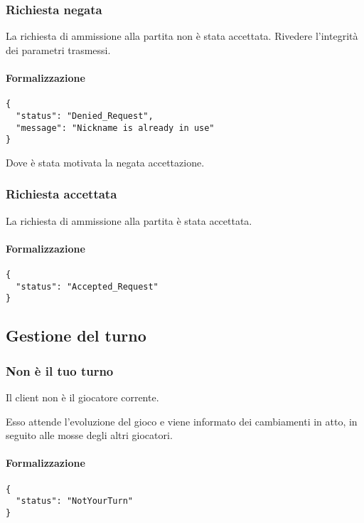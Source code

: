 \documentclass[a4paper,11pt]{article} %
\begin{document}
    \subsubsection{Richiesta negata}
    La richiesta di ammissione alla partita non è stata accettata.
    Rivedere l'integrità dei parametri trasmessi.

    \paragraph{Formalizzazione}
    \begin{verbatim}
{
  "status": "Denied_Request",
  "message": "Nickname is already in use"
}
    \end{verbatim}

    Dove è stata motivata la negata accettazione.

    \subsubsection{Richiesta accettata}
    La richiesta di ammissione alla partita è stata accettata.

    \paragraph{Formalizzazione}
    \begin{verbatim}
{
  "status": "Accepted_Request"
}
    \end{verbatim}

    \newpage

    \subsection{Gestione del turno}\label{subsec:gestione-del-turno}

    \subsubsection{Non è il tuo turno}
    Il client non è il giocatore corrente.

    Esso attende l'evoluzione del gioco e viene informato dei cambiamenti in atto, in seguito alle mosse degli altri giocatori.

    \paragraph{Formalizzazione}
    \begin{verbatim}
{
  "status": "NotYourTurn"
}
    \end{verbatim}
\end{document}
